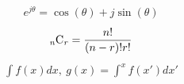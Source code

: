 \documentclass[a4paper,10pt]{ltjsarticle}
\begin{document}
\begin{align*}
  e^{j\theta} = \cos(\theta) + j\sin(\theta)
\end{align*}
\clearpage
\begin{align*}
  _{\it n}\mathrm{C}_{\it r} = \frac{n!}{(n-r)!r!}
\end{align*}
\clearpage
\begin{align*}
  \int f(x)dx, \ g(x)=\int^{x} f(x')dx'
\end{align*}
\end{document}
